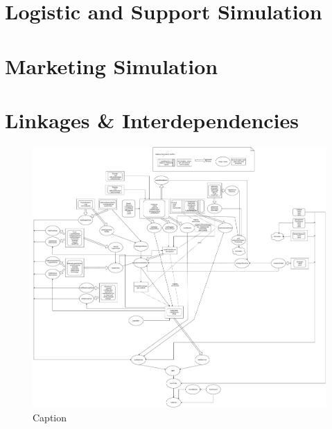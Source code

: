 \documentclass[11pt,titlepage,oneside,openany]{book}
\begin{document}




\section{Logistic and Support Simulation}



\section{Marketing Simulation}









\section{Linkages \& Interdependencies}
\label{sec:link}
\begin{landscape}
\begin{figure}
    \centering
    \includegraphics[scale = 0.5]{images/Tree-like-thing (1).pdf}
    \caption{Caption}
    \label{fig: treeLikeThing}
\end{figure}
\end{landscape}
\end{document}
